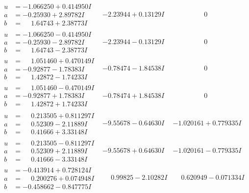 \documentclass[1p]{elsarticle_modified}
\theoremstyle{definition}
\begin{document}
$$\begin{array}{c|c|c}
\begin{aligned}
u &= -1.066250 + 0.414950 I \\
a &= -0.25930 + 2.89782 I \\
b &= \phantom{-}1.64743 + 2.38773 I\end{aligned}
 & -2.23944 + 0.13129 I & \phantom{-0.000000 } 0 \\ \hline\begin{aligned}
u &= -1.066250 - 0.414950 I \\
a &= -0.25930 - 2.89782 I \\
b &= \phantom{-}1.64743 - 2.38773 I\end{aligned}
 & -2.23944 - 0.13129 I & \phantom{-0.000000 } 0 \\ \hline\begin{aligned}
u &= \phantom{-}1.051460 + 0.470149 I \\
a &= -0.92877 - 1.78383 I \\
b &= \phantom{-}1.42872 - 1.74233 I\end{aligned}
 & -0.78474 - 1.84538 I & \phantom{-0.000000 } 0 \\ \hline\begin{aligned}
u &= \phantom{-}1.051460 - 0.470149 I \\
a &= -0.92877 + 1.78383 I \\
b &= \phantom{-}1.42872 + 1.74233 I\end{aligned}
 & -0.78474 + 1.84538 I & \phantom{-0.000000 } 0 \\ \hline\begin{aligned}
u &= \phantom{-}0.213505 + 0.811297 I \\
a &= \phantom{-}0.52309 - 2.11889 I \\
b &= \phantom{-}0.41666 + 3.33148 I\end{aligned}
 & -9.55678 - 0.64630 I & -1.020161 + 0.779335 I \\ \hline\begin{aligned}
u &= \phantom{-}0.213505 - 0.811297 I \\
a &= \phantom{-}0.52309 + 2.11889 I \\
b &= \phantom{-}0.41666 - 3.33148 I\end{aligned}
 & -9.55678 + 0.64630 I & -1.020161 - 0.779335 I \\ \hline\begin{aligned}
u &= -0.413914 + 0.728124 I \\
a &= \phantom{-}0.200276 + 0.074948 I \\
b &= -0.458662 - 0.847775 I\end{aligned}
 & \phantom{-}0.99825 - 2.10282 I & \phantom{-}0.620949 - 0.071334 I \\ \hline\begin{aligned}

\end{aligned}
\end{array}$$
\end{document}
